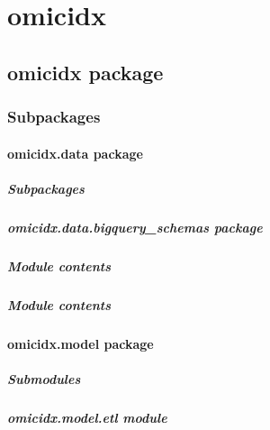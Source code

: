 \documentclass[letterpaper,10pt,english]{sphinxmanual}
\begin{document}
\section{omicidx}
\label{\detokenize{modules:omicidx}}\label{\detokenize{modules::doc}}

\subsection{omicidx package}
\label{\detokenize{omicidx:omicidx-package}}\label{\detokenize{omicidx::doc}}

\subsubsection{Subpackages}
\label{\detokenize{omicidx:subpackages}}

\paragraph{omicidx.data package}
\label{\detokenize{omicidx.data:omicidx-data-package}}\label{\detokenize{omicidx.data::doc}}

\subparagraph{Subpackages}
\label{\detokenize{omicidx.data:subpackages}}

\subparagraph{omicidx.data.bigquery\_schemas package}
\label{\detokenize{omicidx.data.bigquery_schemas:omicidx-data-bigquery-schemas-package}}\label{\detokenize{omicidx.data.bigquery_schemas::doc}}

\subparagraph{Module contents}
\label{\detokenize{omicidx.data.bigquery_schemas:module-omicidx.data.bigquery_schemas}}\label{\detokenize{omicidx.data.bigquery_schemas:module-contents}}

\subparagraph{Module contents}
\label{\detokenize{omicidx.data:module-omicidx.data}}\label{\detokenize{omicidx.data:module-contents}}

\paragraph{omicidx.model package}
\label{\detokenize{omicidx.model:omicidx-model-package}}\label{\detokenize{omicidx.model::doc}}

\subparagraph{Submodules}
\label{\detokenize{omicidx.model:submodules}}

\subparagraph{omicidx.model.etl module}
\label{\detokenize{omicidx.model.etl:module-omicidx.model.etl}}\label{\detokenize{omicidx.model.etl:omicidx-model-etl-module}}\label{\detokenize{omicidx.model.etl::doc}}
\end{document}

